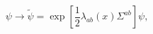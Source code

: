 \begin{equation}\label{eq:lltspinor}
  \psi\to \tilde{\psi}=\exp\left[\frac{1}{2}\lambda_{ab}(x)
\Sigma^{ab}\right]\psi,
\end{equation}

